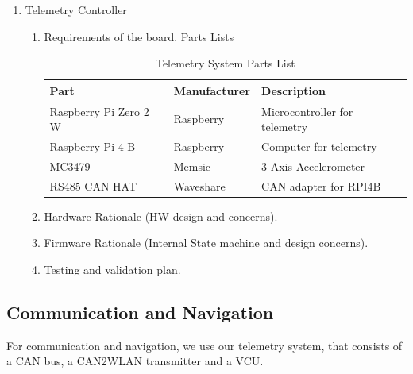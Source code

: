 \begin{enumerate}
\item Telemetry Controller
        \begin{enumerate}
            \item Requirements of the board.
            Parts Lists
                \begin{table}[H]
                    \centering
                    \begin{tabular}{|l|l|l|}
                    \hline
                    \textbf{Part} & \textbf{Manufacturer} & \textbf{Description} \\ \hline
                    Raspberry Pi Zero 2 W & Raspberry & Microcontroller for telemetry \\ \hline
                    Raspberry Pi 4 B & Raspberry & Computer for telemetry \\ \hline
                    MC3479 & Memsic & 3-Axis Accelerometer \\ \hline
                    RS485 CAN HAT & Waveshare & CAN adapter for RPI4B \\ \hline
                    \end{tabular}
                    \caption{Telemetry System Parts List}
                    \label{tab:my-table}
                \end{table}
            \item Hardware Rationale (HW design and concerns).
            
            \item Firmware Rationale (Internal State machine and design concerns).

            \item Testing and validation plan.
        \end{enumerate}
\end{enumerate}

\subsection{Communication and Navigation}
For communication and navigation, we use our telemetry system, that consists of a CAN bus, a CAN2WLAN transmitter and a VCU.

